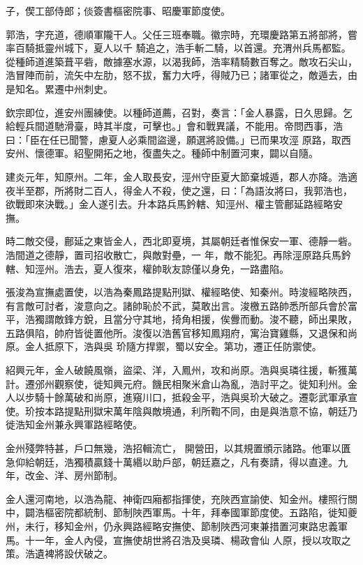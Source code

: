 \begin{pinyinscope}
 子，偰工部侍郎；倓簽書樞密院事、昭慶軍節度使。



 郭浩，字充道，德順軍隴干人。父任三班奉職。徽宗時，充環慶路第五將部將，嘗率百騎抵靈州城下，夏人以千
 騎追之，浩手斬二騎，以首還。充渭州兵馬都監。從種師道進築葺平砦，敵據塞水源，以渴我師，浩率精騎數百奪之。敵攻石尖山，浩冒陣而前，流矢中左肋，怒不拔，奮力大呼，得賊乃已；諸軍從之，敵遁去，由是知名。累遷中州刺史。



 欽宗即位，進安州團練使。以種師道薦，召對，奏言：「金人暴露，日久思歸。乞給輕兵間道馳滑臺，時其半度，可擊也。」會和戰異議，不能用。帝問西事，浩曰：「臣在任已聞警，慮夏人必乘間盜邊，願選將設備。」已而果攻涇
 原路，取西安州、懷德軍。紹聖開拓之地，復盡失之。種師中制置河東，闢以自隨。



 建炎元年，知原州。二年，金人取長安，涇州守臣夏大節棄城遁，郡人亦降。浩適夜半至郡，所將財二百人，得金人不殺，使之還，曰：「為語汝將曰，我郭浩也，欲戰即來決戰。」金人遂引去。升本路兵馬鈐轄、知涇州、權主管鄜延路經略安撫。



 時二敵交侵，鄜延之東皆金人，西北即夏境，其屬朝廷者惟保安一軍、德靜一砦。浩間道之德靜，置司招收散亡，與敵對壘，一
 年，敵不能犯。再除涇原路兵馬鈐轄、知涇州。浩去，夏人復來，權帥耿友諒僅以身免，一路盡陷。



 張浚為宣撫處置使，以浩為秦鳳路提點刑獄、權經略使、知秦州。時浚經略陜西，有言敵可討者，浚意向之。諸帥恥於不武，莫敢出言。浚檄五路帥悉所部兵會於富平，浩獨謂敵鋒方銳，且當分守其地，掎角相援，俟釁而動。浚不聽，師出果敗，五路俱陷，帥府皆徙置他所。浚復以浩舊官移知鳳翔府，寓治寶雞縣，又退保和尚原。金人抵原下，浩與吳
 玠隨方捍禦，蜀以安全。第功，遷正任防禦使。



 紹興元年，金人破饒風嶺，盜梁、洋，入鳳州，攻和尚原。浩與吳璘往援，斬獲萬計。遷邠州觀察使，徙知興元府。饑民相聚米倉山為亂，浩討平之。徙知利州。金人以步騎十餘萬破和尚原，進窺川口，抵殺金平，浩與吳玠大破之。遷彰武軍承宣使。玠按本路提點刑獄宋萬年陰與敵境通，利所鞫不同，由是與浩意不協，朝廷乃徙浩知金州兼永興軍路經略使。



 金州殘弊特甚，戶口無幾，浩招輯流亡，
 開營田，以其規置頒示諸路。他軍以匱急仰給朝廷，浩獨積贏錢十萬緡以助戶部，朝廷嘉之，凡有奏請，得以直達。九年，改金、洋、房州節制。



 金人還河南地，以浩為龍、神衛四廂都指揮使，充陜西宣諭使、知金州。樓照行關中，闢浩樞密院都統制、節制陜西軍馬。十年，拜奉國軍節度使。五路陷，徙知夔州，未行，移知金州，仍永興路經略安撫使、節制陜西河東兼措置河東路忠義軍馬。十一年，金人內侵，宣撫使胡世將召浩及吳璘、楊政會仙
 人原，授以攻取之策。浩遺裨將設伏破之。




\end{pinyinscope}
